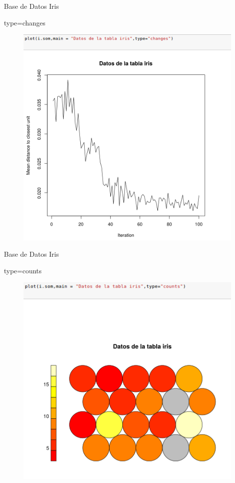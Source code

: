 \documentclass{beamer}
\begin{document}
\begin{frame}{Base de Datos Iris}
\begin{block}{type=changes}
\begin{figure}
\includegraphics[scale=0.4]{changes.png}
\centering
\end{figure}
\end{block}
\end{frame}

\begin{frame}{Base de Datos Iris}
\begin{block}{type=counts}
\begin{figure}
\includegraphics[scale=0.4]{counts.png}
\centering
\end{figure}
\end{block}
\end{frame}
\end{document}
